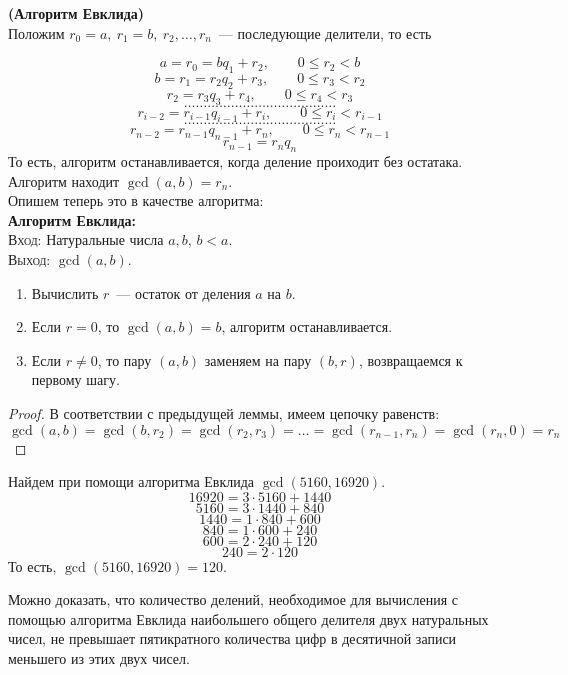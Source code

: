 \documentclass[11pt]{article}
\begin{document}
	\begin{theorem}\textbf{(Алгоритм Евклида)}\label{EuclidAlgo}\\
		Положим $r_0 = a, \ r_1 = b, \ r_2, \ldots, r_n$~--- последующие делители, то есть

		\[	a = r_0 = b q_1 + r_2, \qquad 0 \le r_2 < b  \]
		\[	b = r_1 = r_2 q_2 + r_3, \qquad 0 \le r_3 < r_2 \]
		\[	r_2 = r_3 q_3 + r_4, \qquad 0 \le r_4 < r_3 \]
		\[	\ldots \ldots \ldots \ldots \ldots \ldots \ldots \ldots \ldots \ldots \ldots \ldots \ldots  \]
		\[	r_{i - 2} = r_{i - 1} q_{i - 1} + r_{i}, \qquad 0 \le r_{i} < r_{i - 1} \]
		\[	\ldots \ldots \ldots \ldots \ldots \ldots \ldots \ldots \ldots \ldots \ldots \ldots \ldots \]
		\[	r_{n - 2} = r_{n - 1} q_{n - 1} + r_{n}, \qquad 0 \le r_n < r_{n - 1} \]
		\[	r_{n - 1} = r_n q_{n} \]
	То есть, алгоритм останавливается, когда деление проиходит без остатака. Алгоритм находит $\gcd(a, b) = r_n$.\\
	Опишем теперь это в качестве алгоритма:\\
	\textbf{Алгоритм Евклида:}\\
	\textsc{Вход:} Натуральные числа $a, b$, $b < a$.\\
	\textsc{Выход:} $\gcd(a, b)$.
	\begin{enumerate}

		\item Вычислить $r$~--- остаток  от деления $a$ на $b$.

		\item Если $r = 0$, то $\gcd(a, b) = b$, алгоритм останавливается.

		\item Если $r \neq 0$, то пару $(a, b)$ заменяем на пару $(b, r)$, возвращаемся к первому шагу.

	\end{enumerate}
	\end{theorem}
	\begin{proof}
	    В соответствии с предыдущей леммы, имеем цепочку равенств:
		\[ \gcd(a, b) = \gcd(b, r_2) = \gcd(r_2, r_3) = \ldots = \gcd(r_{n - 1}, r_n) = \gcd(r_n, 0) = r_n \]
	\end{proof}
	\begin{example} Найдем при помощи алгоритма Евклида $\gcd(5160, 16920)$.
	\[ 16920 = 3 \cdot 5160 + 1440 \]
	\[ 5160 = 3 \cdot 1440 + 840 \]
	\[ 1440 = 1 \cdot 840 + 600 \]
	\[ 840 = 1 \cdot 600 + 240 \]
	\[ 600 = 2 \cdot 240 + 120 \]
	\[ 240 = 2 \cdot 120 \]
	То есть, $\gcd(5160, 16920) = 120$.
	\end{example}
	\begin{remark}
	    Можно доказать, что количество делений, необходимое для вычисления с помощью алгоритма Евклида наибольшего
		общего делителя двух натуральных чисел, не превышает пятикратного количества цифр в десятичной записи меньшего из
		этих двух чисел.
	\end{remark}
\end{document}
